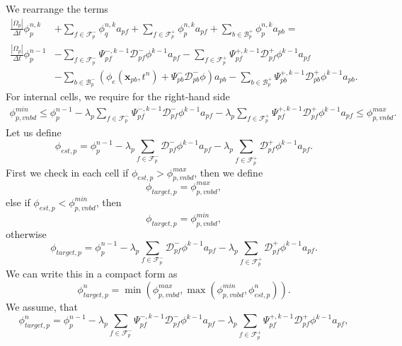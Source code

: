 \documentclass[../thesis.tex]{subfiles}
\begin{document}
We rearrange the terms
\begin{equation}
	\begin{split}
		\frac{|\Omega_p|}{\Delta t}\phi^{n,k}_p
		&+ \sum_{f \in \mathcal{F}_p^-}
		\phi_q^{n,k} a_{pf}
		+ \sum_{f \in \mathcal{F}_p^+}
		\phi_p^{n,k} a_{pf}
		+ \sum_{b \in \mathcal{B}_p^+}
		\phi_p^{n,k} a_{pb}
		=\\
		\frac{|\Omega_p|}{\Delta t}\phi_p^{n-1}
		&-\sum_{f \in \mathcal{F}_p^-}
		\Psi_{pf}^{-, k-1}\mathcal{D}^-_{pf}\phi^{k-1}  a_{pf}
		- \sum_{f \in \mathcal{F}_p^+}
		\Psi_{pf}^{+, k-1}\mathcal{D}^+_{pf}\phi^{k-1}  a_{pf}
		\\
		&-\sum_{b \in \mathcal{B}_p^-}
		\left(
			\phi_e(\mathbf{x}_{pb}, t^{n})
			+ \Psi_{pb}^-\mathcal{D}^-_{pb}\phi
		\right) a_{pb}
		- \sum_{b \in \mathcal{B}_p^+}
		\Psi_{pb}^{+, k-1}\mathcal{D}^+_{pb}\phi^{k-1} a_{pb}.
	\end{split}
\end{equation}
For internal cells, we require for the right-hand side
\begin{equation*}
	\begin{split}
		\phi_{p, vnbd}^{min}
		\leq
		\phi_p^{n-1}
		- \lambda_p \sum_{f \in \mathcal{F}_p^-}
		\Psi_{pf}^{-,k-1}\mathcal{D}^-_{pf}\phi^{k-1} a_{pf}
		- \lambda_p \sum_{f \in \mathcal{F}_p^+}
		\Psi_{pf}^{+,k-1}\mathcal{D}^+_{pf}\phi^{k-1} a_{pf}
		\leq
		\phi_{p, vnbd}^{max}.
	\end{split}
\end{equation*}
Let us define
\begin{equation}
	\phi_{est,p} = \phi_p^{n-1}
	- \lambda_p \sum_{f \in \mathcal{F}_p^-}
	\mathcal{D}^-_{pf}\phi^{k-1} a_{pf}
	- \lambda_p \sum_{f \in \mathcal{F}_p^+}
	\mathcal{D}^+_{pf}\phi^{k-1} a_{pf}.
\end{equation}
First we check in each cell if \(\phi_{est,p} > \phi_{p, vnbd}^{max}\), then we define
\[
	\phi_{target,p} = \phi_{p, vnbd}^{max},
\]
else if \(\phi_{est,p} < \phi_{p, vnbd}^{min}\), then
\[
	\phi_{target,p} = \phi_{p, vnbd}^{min},
\]
otherwise
\[
	\phi_{target,p} = \phi_p^{n-1}
	- \lambda_p \sum_{f \in \mathcal{F}_p^-}
	\mathcal{D}^-_{pf}\phi^{k-1} a_{pf}
	- \lambda_p \sum_{f \in \mathcal{F}_p^+}
	\mathcal{D}^+_{pf}\phi^{k-1} a_{pf}.
\]
We can write this in a compact form as
\begin{equation}
	\phi_{target,p}^n =
	\min
	\left( \phi_{p, vnbd}^{max},
	\max
	\left( \phi_{p, vnbd}^{min}, \phi_{est,p}^n \right) \right).
\end{equation}
We assume, that
\begin{equation}
	\phi_{target,p}^n = \phi_p^{n-1}
	- \lambda_p \sum_{f \in \mathcal{F}_p^-}
	\Psi_{pf}^{-,k-1}\mathcal{D}^-_{pf}\phi^{k-1} a_{pf}
	- \lambda_p \sum_{f \in \mathcal{F}_p^+}
	\Psi_{pf}^{+,k-1}\mathcal{D}^+_{pf}\phi^{k-1} a_{pf},
\end{equation}
\end{document}
